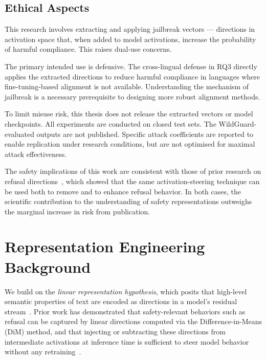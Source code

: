 \subsection{Ethical Aspects}

This research involves extracting and applying jailbreak vectors — directions in activation space that, when added to model activations, increase the probability of harmful compliance. This raises dual-use concerns.

The primary intended use is defensive. The cross-lingual defense in RQ3 directly applies the extracted directions to reduce harmful compliance in languages where fine-tuning-based alignment is not available. Understanding the mechanism of jailbreak is a necessary prerequisite to designing more robust alignment methods.

To limit misuse risk, this thesis does not release the extracted vectors or model checkpoints. All experiments are conducted on closed test sets. The WildGuard-evaluated outputs are not published. Specific attack coefficients are reported to enable replication under research conditions, but are not optimised for maximal attack effectiveness.

The safety implications of this work are consistent with those of prior research on refusal directions~\citep{arditi2024refusal}, which showed that the same activation-steering technique can be used both to remove and to enhance refusal behavior. In both cases, the scientific contribution to the understanding of safety representations outweighs the marginal increase in risk from publication.

\section{Representation Engineering Background}
\label{sec:repeng}

We build on the \textit{linear representation hypothesis}, which posits that high-level semantic properties of text are encoded as directions in a model's residual stream~\citep{zou2023representation}. Prior work has demonstrated that safety-relevant behaviors such as refusal can be captured by linear directions computed via the Difference-in-Means (DiM) method, and that injecting or subtracting these directions from intermediate activations at inference time is sufficient to steer model behavior without any retraining~\citep{arditi2024refusal}.

